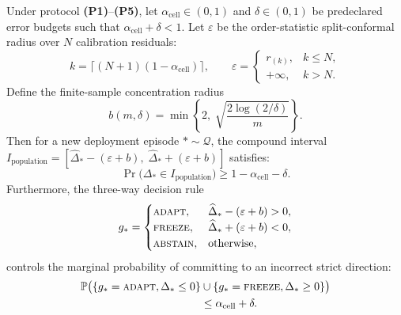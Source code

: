 \begin{theorem}\label{thm:app-pop-cert}
Under protocol \textbf{(P1)}--\textbf{(P5)}, let $\alpha_{\mathrm{cell}} \in (0, 1)$ and $\delta \in (0, 1)$ be
predeclared error budgets such that $\alpha_{\mathrm{cell}} + \delta < 1$. Let $\varepsilon$ be the order-statistic
split-conformal radius over $N$ calibration residuals:
\begin{equation}
 k = \lceil(N+1)(1-\alpha_{\mathrm{cell}})\rceil, \qquad
 \varepsilon = \begin{cases} r_{(k)}, & k \le N, \\ +\infty, & k > N. \end{cases}
\end{equation}
Define the finite-sample concentration radius
\begin{equation}
 b(m, \delta) = \min\left\{2, \; \sqrt{\frac{2\log(2/\delta)}{m}}\right\}.
 \label{eq:app-hoeffding-radius}
\end{equation}
Then for a new deployment episode $* \sim \mathcal Q$, the compound interval
$I_{\mathrm{population}} = [\widehat\Delta_* - (\varepsilon + b), \; \widehat\Delta_* + (\varepsilon + b)]$
satisfies:
\begin{equation}
 \Pr\bigl(\Delta_* \in I_{\mathrm{population}}\bigr) \ge 1 - \alpha_{\mathrm{cell}} - \delta.
\end{equation}
Furthermore, the three-way decision rule
\begin{equation}
 g_* = \begin{cases}
 \textnormal{\textsc{adapt}}, & \widehat\Delta_* - (\varepsilon + b) > 0, \\
 \textnormal{\textsc{freeze}}, & \widehat\Delta_* + (\varepsilon + b) < 0, \\
 \textnormal{\textsc{abstain}}, & \text{otherwise},
 \end{cases}
\end{equation}
controls the marginal probability of committing to an incorrect strict direction:
\begin{align}
 \mathbb{P}\bigl(\{g_* = \textnormal{\textsc{adapt}}, \Delta_* \le 0\} &\cup \{g_* = \textnormal{\textsc{freeze}}, \Delta_* \ge 0\}\bigr) \notag \\
 &\le \alpha_{\mathrm{cell}} + \delta.
\end{align}
\end{theorem}

